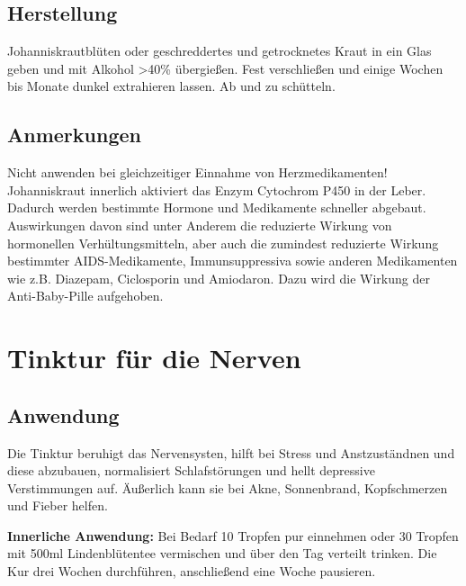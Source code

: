 \subsection{Herstellung}

Johanniskrautblüten oder geschreddertes und getrocknetes Kraut in ein Glas geben und mit Alkohol >40\% übergießen. Fest verschließen und einige Wochen bis Monate dunkel extrahieren lassen. Ab und zu schütteln.

\subsection{Anmerkungen}

Nicht anwenden bei gleichzeitiger Einnahme von Herzmedikamenten! Johanniskraut innerlich aktiviert das Enzym Cytochrom P450 in der Leber. Dadurch werden bestimmte Hormone und Medikamente schneller abgebaut. Auswirkungen davon sind unter Anderem die reduzierte Wirkung von hormonellen Verhültungsmitteln, aber auch die zumindest reduzierte Wirkung bestimmter AIDS-Medikamente, Immunsuppressiva sowie anderen Medikamenten wie z.B. Diazepam, Ciclosporin und Amiodaron. Dazu wird die Wirkung der Anti-Baby-Pille aufgehoben.



\newpage



\section{Tinktur für die Nerven}

\cite{nedoma2018heiltinkturen}

         

\subsection{Anwendung}

Die Tinktur beruhigt das Nervensysten, hilft bei Stress und Anstzuständnen und diese abzubauen, normalisiert Schlafstörungen und hellt depressive Verstimmungen auf. Äußerlich  kann sie bei Akne, Sonnenbrand, Kopfschmerzen und Fieber helfen.

\textbf{Innerliche Anwendung:} Bei Bedarf 10 Tropfen pur einnehmen oder 30 Tropfen mit 500ml Lindenblütentee vermischen und über den Tag verteilt trinken. Die Kur drei Wochen durchführen, anschließend eine Woche pausieren.\\ 

